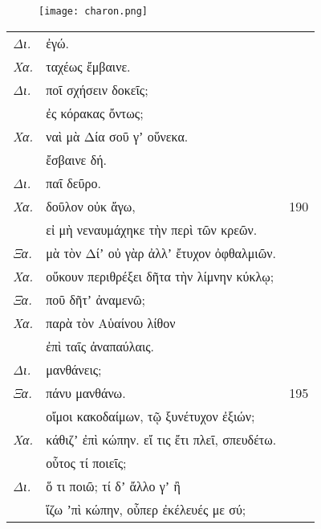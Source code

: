 \documentclass[13pt]{article}
\begin{document}
\begin{greek}
\begin{multicols}{2}
\begin{parcolumns}[colwidths={1=1.5em, 2=0.9\linewidth}]{2}
\end{parcolumns}
\end{multicols}

\begin{figure}
    \centering
    \texttt{[image: charon.png]}
\end{figure}

\newpage

\begin{spacing}{1.5}

\begin{tabularx}{\textwidth}{@{}lXr@{}}
  \textit{Δι.} & ἐγώ. & \\
  \textit{Χα.} & \hspace{2.5em}ταχέως ἔμβαινε. & \\
  \textit{Δι.} & \hspace{10em} ποῖ σχήσειν δοκεῖς; & \\
  & ἐς κόρακας ὄντως; & \\
  \textit{Χα.} & \hspace{9em}ναὶ μὰ Δία σοῦ γʼ οὕνεκα. & \\
  & ἔσβαινε δή. & \\
  \textit{Δι.} & \hspace{6em}παῖ δεῦρο. & \\
  \textit{Χα.} & \hspace{11em}δοῦλον οὐκ ἄγω, & 190 \\
  & εἰ μὴ νεναυμάχηκε τὴν περὶ τῶν κρεῶν. & \\
  \textit{Ξα.} & μὰ τὸν Δίʼ οὐ γὰρ ἀλλʼ ἔτυχον ὀφθαλμιῶν. & \\
  \textit{Χα.} & οὔκουν περιθρέξει δῆτα τὴν λίμνην κύκλῳ; & \\
  \textit{Ξα.} & ποῦ δῆτʼ ἀναμενῶ; & \\
  \textit{Χα.} & \hspace{8em} παρὰ τὸν Αὑαίνου λίθον & \\
  & ἐπὶ ταῖς ἀναπαύλαις. & \\
  \textit{Δι.} & \hspace{9em} μανθάνεις; & \\
  \textit{Ξα.} & \hspace{14em} πάνυ μανθάνω. & 195 \\
  & οἴμοι κακοδαίμων, τῷ ξυνέτυχον ἐξιών; & \\
  \textit{Χα.} & κάθιζʼ ἐπὶ κώπην. εἴ τις ἔτι πλεῖ, σπευδέτω. & \\
  & οὗτος τί ποιεῖς; & \\
  \textit{Δι.} & \hspace{7em} ὅ τι ποιῶ; τί δʼ ἄλλο γʼ ἢ & \\
  & ἵζω ʼπὶ κώπην, οὗπερ ἐκέλευές με σύ; & \\
  

\end{tabularx}
\end{spacing}
\end{greek}
\end{document}
